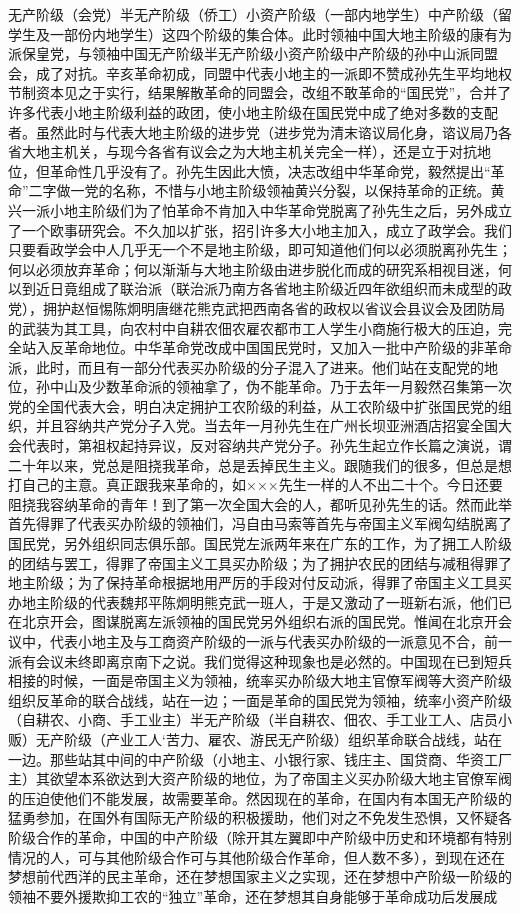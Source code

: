 无产阶级（会党）半无产阶级（侨工）小资产阶级（一部内地学生）中产阶级（留学生及一部份内地学生）这四个阶级的集合体。此时领袖中国大地主阶级的康有为派保皇党，与领袖中国无产阶级半无产阶级小资产阶级中产阶级的孙中山派同盟会，成了对抗。辛亥革命初成，同盟中代表小地主的一派即不赞成孙先生平均地权节制资本见之于实行，结果解散革命的同盟会，改组不敢革命的“国民党”，合并了许多代表小地主阶级利益的政团，使小地主阶级在国民党中成了绝对多数的支配者。虽然此时与代表大地主阶级的进步党（进步党为清末谘议局化身，谘议局乃各省大地主机关，与现今各省有议会之为大地主机关完全一样），还是立于对抗地位，但革命性几乎没有了。孙先生因此大愤，决志改组中华革命党，毅然提出“革命”二字做一党的名称，不惜与小地主阶级领袖黄兴分裂，以保持革命的正统。黄兴一派小地主阶级们为了怕革命不肯加入中华革命党脱离了孙先生之后，另外成立了一个欧事研究会。不久加以扩张，招引许多大小地主加入，成立了政学会。我们只要看政学会中人几乎无一个不是地主阶级，即可知道他们何以必须脱离孙先生；何以必须放弃革命；何以渐渐与大地主阶级由进步脱化而成的研究系相视目迷，何以到近日竟组成了联治派（联治派乃南方各省地主阶级近四年欲组织而未成型的政党），拥护赵恒惕陈炯明唐继花熊克武把西南各省的政权以省议会县议会及团防局的武装为其工具，向农村中自耕农佃农雇农都市工人学生小商施行极大的压迫，完全站入反革命地位。中华革命党改成中国国民党时，又加入一批中产阶级的非革命派，此时，而且有一部分代表买办阶级的分子混入了进来。他们站在支配党的地位，孙中山及少数革命派的领袖拿了，伪不能革命。乃于去年一月毅然召集第一次党的全国代表大会，明白决定拥护工农阶级的利益，从工农阶级中扩张国民党的组织，并且容纳共产党分子入党。当去年一月孙先生在广州长坝亚洲酒店招宴全国大会代表时，第祖权起持异议，反对容纳共产党分子。孙先生起立作长篇之演说，谓二十年以来，党总是阻挠我革命，总是丢掉民生主义。跟随我们的很多，但总是想打自己的主意。真正跟我来革命的，如×××先生一样的人不出二十个。今日还要阻挠我容纳革命的青年！到了第一次全国大会的人，都听见孙先生的话。然而此举首先得罪了代表买办阶级的领袖们，冯自由马索等首先与帝国主义军阀勾结脱离了国民党，另外组织同志俱乐部。国民党左派两年来在广东的工作，为了拥工人阶级的团结与罢工，得罪了帝国主义工具买办阶级；为了拥护农民的团结与减租得罪了地主阶级；为了保持革命根据地用严厉的手段对付反动派，得罪了帝国主义工具买办地主阶级的代表魏邦平陈炯明熊克武一班人，于是又激动了一班新右派，他们已在北京开会，图谋脱离左派领袖的国民党另外组织右派的国民党。惟闻在北京开会议中，代表小地主及与工商资产阶级的一派与代表买办阶级的一派意见不合，前一派有会议未终即离京南下之说。我们觉得这种现象也是必然的。中国现在已到短兵相接的时候，一面是帝国主义为领袖，统率买办阶级大地主官僚军阀等大资产阶级组织反革命的联合战线，站在一边；一面是革命的国民党为领袖，统率小资产阶级（自耕农、小商、手工业主）半无产阶级（半自耕农、佃农、手工业工人、店员小贩）无产阶级（产业工人`苦力、雇农、游民无产阶级）组织革命联合战线，站在一边。那些站其中间的中产阶级（小地主、小银行家、钱庄主、国贷商、华资工厂主）其欲望本系欲达到大资产阶级的地位，为了帝国主义买办阶级大地主官僚军阀的压迫使他们不能发展，故需要革命。然因现在的革命，在国内有本国无产阶级的猛勇参加，在国外有国际无产阶级的积极援助，他们对之不免发生恐惧，又怀疑各阶级合作的革命，中国的中产阶级（除开其左翼即中产阶级中历史和环境都有特别情况的人，可与其他阶级合作可与其他阶级合作革命，但人数不多），到现在还在梦想前代西洋的民主革命，还在梦想国家主义之实现，还在梦想中产阶级一阶级的领袖不要外援欺抑工农的“独立”革命，还在梦想其自身能够于革命成功后发展成